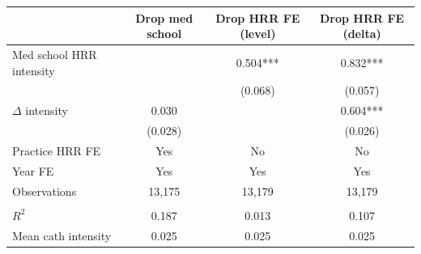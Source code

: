
\begin{tabular}{lccc}
\toprule
 & Drop med school & Drop HRR FE (level) & Drop HRR FE (delta)\\
\midrule
Med school HRR intensity &  & 0.504*** & 0.832***\\
 &  & (0.068) & (0.057)\\
$\Delta$ intensity & 0.030 &  & 0.604***\\
 & (0.028) &  & (0.026)\\
\addlinespace
Practice HRR FE & Yes & No & No\\
Year FE & Yes & Yes & Yes\\
Observations & 13,175 & 13,179 & 13,179\\
\midrule\\
$R^2$ & 0.187 & 0.013 & 0.107\\
Mean cath intensity & 0.025 & 0.025 & 0.025\\
\bottomrule
\end{tabular}
